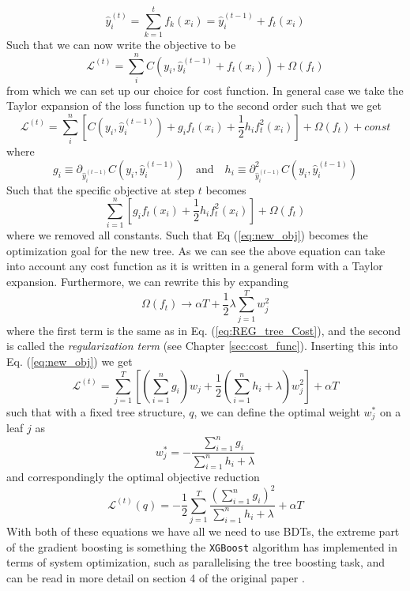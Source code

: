 \documentclass[12pt, a4paper]{book}
\begin{document}
\begin{equation}\label{eq:eff_ensemble}
    \hat{y}_i^{(t)}=\sum_{k=1}^{t}f_k(x_i) = \hat{y}_i^{(t-1)}+f_t(x_i)
\end{equation}
Such that we can now write the objective to be
\begin{equation}
    \mathcal{L}^{(t)}=\sum_{i}^{n}C(y_i,\hat{y}_i^{(t-1)}+f_t(x_i))+\Omega(f_t)
\end{equation}
from which we can set up our choice for cost function. In general case we take the Taylor expansion of the loss function up to the second order such that we get
$$
    \mathcal{L}^{(t)}=\sum_{i}^{n}\left[C(y_i,\hat{y}_i^{(t-1)})+g_i f_t(x_i)+\frac{1}{2}h_i f_t^2(x_i)\right]+\Omega(f_t)+const
$$
where 
$$
    g_i \equiv \partial_{\hat{y}_i^{(t-1)}}C(y_i,\hat{y}_i^{(t-1)}) \quad\text{and}\quad   h_i \equiv \partial^2_{\hat{y}_i^{(t-1)}}C(y_i,\hat{y}_i^{(t-1)})
$$
Such that the specific objective at step $t$ becomes
\begin{equation}\label{eq:new_obj}
    \sum_{i=1}^{n}\left[ g_i f_t(x_i) +\frac{1}{2}h_i f_t^2(x_i)\right] +\Omega(f_t)
\end{equation}
where we removed all constants. Such that Eq (\ref{eq:new_obj}) becomes the optimization goal for the new tree. As we can see the above equation can take into account any cost function as it is written in a general form with a Taylor expansion. Furthermore, we can rewrite this by expanding 
$$
\Omega(f_t) \rightarrow \alpha T + \frac{1}{2}\lambda\sum_{j=1}^{T} w_j^2 
$$ 
where the first term is the same as in Eq. (\ref{eq:REG_tree_Cost}), and the second is called the \textit{regularization term} (see Chapter \ref{sec:cost_func}). Inserting this into Eq. (\ref{eq:new_obj}) we get
$$
\mathcal{L}^{(t)} = \sum_{j=1}^{T}\left[\left(\sum_{i=1}^{n} g_i\right)w_j +\frac{1}{2}\left(\sum_{i=1}^{n} h_i +\lambda \right)w_j^2\right] +\alpha T
$$
such that with a fixed tree structure, $q$, we can define the optimal weight $w_j^*$ on a leaf $j$ as 
\begin{equation}\label{eq:opt_wgt_bdt}
    w_j^*=-\frac{\sum_{i=1}^{n} g_i}{\sum_{i=1}^{n} h_i+\lambda}
\end{equation}
and correspondingly the optimal objective reduction
\begin{equation}\label{eq:opt_obj_bdt}
    \mathcal{L}^{(t)}(q)=-\frac{1}{2}\sum_{j=1}^{T}\frac{(\sum_{i=1}^{n} g_i)^2}{\sum_{i=1}^{n} h_i+\lambda}+\alpha T
\end{equation}
With both of these equations we have all we need to use BDTs, the extreme part of the gradient boosting is something the \verb|XGBoost| algorithm has implemented in terms of system optimization, such as parallelising the tree boosting task, and can be read in more detail on section 4 of the original paper \cite{XGBoost}.
\end{document}
